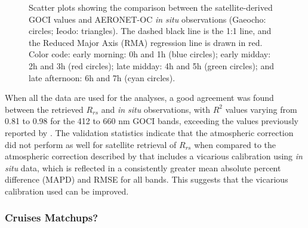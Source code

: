 \documentclass[onecolumn,3p,letterpaper,11pt]{elsarticle}
\begin{document}
\begin{figure}[H]
    \caption{Scatter plots showing the comparison between the satellite-derived GOCI values and AERONET-OC {\it in situ} observations (Gaeocho: circles; Ieodo: triangles). The dashed black line is the 1:1 line, and the Reduced Major Axis (RMA) regression line is drawn in red. Color code: early morning: 0h and 1h (blue circles); early midday: 2h and 3h (red circles); late midday: 4h and 5h (green circles); and late afternoon: 6h and 7h (cyan circles). \label{fig:GOCI_AERO} } 
\end{figure}

When all the data are used for the analyses, a good agreement was found between the retrieved $R_{rs}$ and {\it in situ} observations, with $R^2$ values varying from 0.81 to 0.98 for the 412 to 660 nm GOCI bands, exceeding the values previously reported by \citet{Ahn2015}. The validation statistics indicate that the atmospheric correction did not perform as well for satellite retrieval of $R_{rs}$ when compared to the atmospheric correction described by \citet{Ahn2015} that includes a vicarious calibration using {\it in situ} data, which is reflected in a consistently greater mean absolute percent difference (MAPD) and RMSE for all bands. This suggests that the vicarious calibration used can be improved. 
\subsubsection{Cruises Matchups?}

\end{document}

